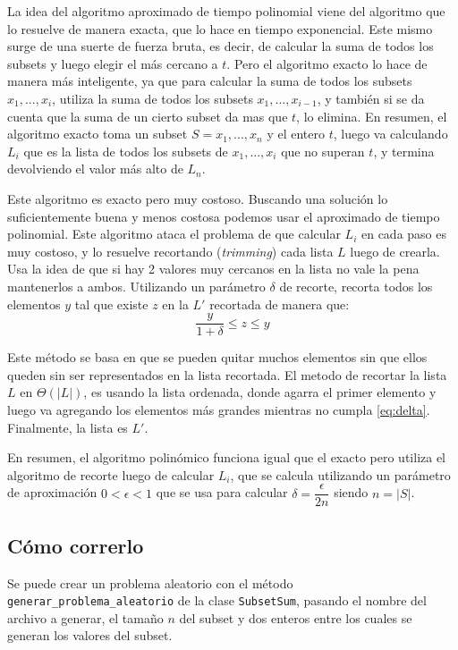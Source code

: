 \documentclass[a4paper,10pt]{article}
\begin{document}
La idea del algoritmo aproximado de tiempo polinomial viene del algoritmo que lo resuelve de manera exacta, que lo hace en tiempo exponencial. Este mismo surge de una suerte de fuerza bruta, es decir, de calcular la suma de todos los subsets y luego elegir el más cercano a $t$. Pero el algoritmo exacto lo hace de manera más inteligente, ya que para calcular la suma de todos los subsets ${x_1,...,x_i}$, utiliza la suma de todos los subsets ${x_1,...,x_{i-1}}$, y también si se da cuenta que la suma de un cierto subset da mas que $t$, lo elimina. En resumen, el algoritmo exacto toma un subset $S={x_1,...,x_n}$ y el entero $t$, luego va calculando $L_i$ que es la lista de todos los subsets de ${x_1,...,x_i}$ que no superan $t$, y termina devolviendo el valor más alto de $L_n$.

Este algoritmo es exacto pero muy costoso. Buscando una solución lo suficientemente buena y menos costosa podemos usar el aproximado de tiempo polinomial. Este algoritmo ataca el problema de que calcular $L_i$ en cada paso es muy costoso, y lo resuelve recortando (\textit{trimming}) cada lista $L$ luego de crearla. Usa la idea de que si hay 2 valores muy cercanos en la lista no vale la pena mantenerlos a ambos. Utilizando un parámetro $\delta$ de recorte, recorta todos los elementos $y$ tal que existe $z$ en la $L'$ recortada de manera que:
\begin{equation}
	\label{eq:delta}
	\dfrac{y} {1+\delta} \leq z \leq y \tag{3.1}
\end{equation}

Este método se basa en que se pueden quitar muchos elementos sin que ellos queden sin ser representados en la lista recortada. El metodo de recortar la lista $L$ en $\Theta(|L|)$, es usando la lista ordenada, donde agarra el primer elemento y luego va agregando los elementos más grandes mientras no cumpla \ref{eq:delta}. Finalmente, la lista es $L'$.

En resumen, el algoritmo polinómico funciona igual que el exacto pero utiliza el algoritmo de recorte luego de calcular $L_i$, que se calcula utilizando un parámetro de aproximación $0 < \epsilon < 1$ que se usa para calcular $\delta = \dfrac{\epsilon} {2n}$ siendo $n=|S|$.

\subsection{Cómo correrlo}
Se puede crear un problema aleatorio con el método \texttt{generar\_problema\_aleatorio} de la clase \texttt{SubsetSum}, pasando el nombre del archivo a generar, el tamaño $n$ del subset y dos enteros entre los cuales se generan los valores del subset.
\end{document}
